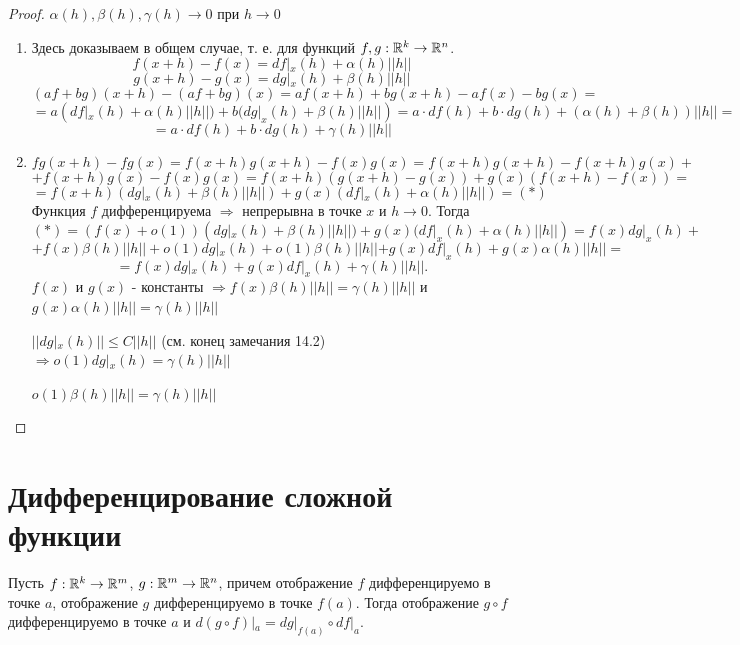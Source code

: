     \begin{proof}
    	$\alpha(h), \beta(h), \gamma(h) \to 0$ при $h \to 0$
    	\begin{enumerate}
    		\item Здесь доказываем в общем случае, т. е. для функций $f, g : \mathbb R^k \rightarrow \mathbb R^n$.
    	    \[ f(x + h) - f(x) = df|_x(h) + \alpha(h)||h|| \]
    	    \[ g(x + h) - g(x) = dg|_x(h) + \beta(h)||h|| \]
    	    \[ (af + bg)(x + h) - (af + bg)(x) = af(x + h) + bg(x + h) - af(x) - bg(x) = \]
    	    \[ = a(df|_x(h) + \alpha(h)||h||) + b(dg|_x(h) + \beta(h)||h||) = a \cdot df(h) + b \cdot dg(h) + (\alpha(h) + \beta(h))||h|| = \]
    	    \[ = a \cdot df(h) + b \cdot dg(h) + \gamma(h)||h|| \]
    	    \item 
    	    \[ fg(x + h) - fg(x) = f(x + h)g(x + h) - f(x)g(x) = f(x + h)g(x + h) - f(x + h)g(x) + \] \[ + f(x + h)g(x) - f(x)g(x) = f(x + h)(g(x + h) - g(x)) + g(x)(f(x + h) - f(x)) = \]
    	    \[ = f(x + h) (dg|_x(h) + \beta(h)||h||) + g(x)(df|_x(h) + \alpha(h)||h||) = (*) \]
    	    Функция $f$ дифференцируема $\Rightarrow$ непрерывна в точке $x$ и $h \to 0$. Тогда
    	    \[ (*) = (f(x) + o(1)) (dg|_x(h) + \beta(h)||h||) + g(x)(df|_x(h) + \alpha(h)||h||) = f(x)dg|_x(h) + \]
    	    \[ + f(x)\beta(h)||h|| + o(1)dg|_x(h) + o(1)\beta(h)||h|| + g(x)df|_x(h) + g(x) \alpha(h)||h|| = \]
    	    \[ = f(x) dg|_x(h) + g(x) df|_x(h) + \gamma(h) ||h||. \]
    	    $f(x)$ и $g(x)$ - константы $\Rightarrow f(x)\beta(h)||h|| = \gamma(h) ||h||$ и $g(x) \alpha(h)||h|| = \gamma(h) ||h||$
    	     
    	    $||dg|_x(h)|| \leqslant C||h||$ (см. конец замечания 14.2) $\Rightarrow o(1)dg|_x(h) = \gamma(h) ||h||$
    	    
    	    $o(1)\beta(h)||h|| = \gamma(h) ||h||$
    	\end{enumerate}
    \end{proof}
    
    \section{Дифференцирование сложной функции}
    
    \begin{theorem}
    	Пусть $f : \mathbb R^k \rightarrow \mathbb R^m$, $g : \mathbb R^m \rightarrow \mathbb R^n$, причем отображение $f$ дифференцируемо в точке $a$, отображение $g$ дифференцируемо в точке $f(a)$. Тогда отображение $g \circ f$ дифференцируемо в точке $a$ и $d(g \circ f)|_a = dg|_{f(a)} \circ df|_a$.
    \end{theorem}
    
